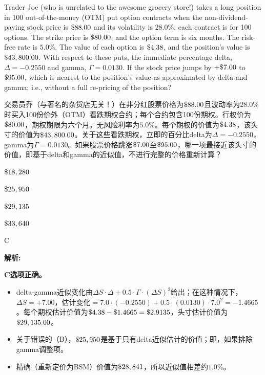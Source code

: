 \documentclass{article}
\newcommand{\dollar}{\ifmmode\text{\$}\else\$\fi}  %
\newcounter{question} %
\newenvironment{explanation}
{\textbf{解析:}\par}
{\par}
\begin{document}
\begin{question}
    Trader Joe (who is unrelated to the awesome grocery store!) takes a long position in 100 out-of-the-money (OTM) put option contracts when the non-dividend-paying stock price is $\dollar88.00$ and its volatility is $28.0\%$; each contract is for 100 options. The strike price is $\dollar80.00$, and the option term is six months. The risk-free rate is $5.0\%$. The value of each option is $\dollar4.38$, and the position's value is $\dollar43,800.00$. With respect to these puts, the immediate percentage delta, $\Delta = -0.2550$ and gamma, $\Gamma = 0.0130$. If the stock price jumps by $+\dollar7.00$ to $\dollar95.00$, which is nearest to the position's value as approximated by delta and gamma; i.e., without a full re-pricing of the position?

    交易员乔（与著名的杂货店无关！）在非分红股票价格为$\dollar88.00$且波动率为$28.0\%$时买入100份价外（OTM）看跌期权合约；每个合约包含100份期权。行权价为$\dollar80.00$，期权期限为六个月。无风险利率为$5.0\%$。每个期权的价值为$\dollar4.38$，该头寸的价值为$\dollar43,800.00$。关于这些看跌期权，立即的百分比delta为$\Delta = -0.2550$，gamma为$\Gamma = 0.0130$。如果股票价格跳涨$\dollar7.00$至$\dollar95.00$，哪一项最接近该头寸的价值，即基于delta和gamma的近似值，不进行完整的价格重新计算？
\end{question}

\begin{choices}
    \item $\dollar18,280$
    \item $\dollar25,950$
    \item $\dollar29,135$
    \item $\dollar33,640$
\end{choices}

\begin{correctanswer}
C
\end{correctanswer}

\begin{explanation}
    \textbf{C选项正确。} 
    \begin{itemize}
        \item delta-gamma近似变化由$\Delta S \cdot \Delta + 0.5 \cdot \Gamma \cdot (\Delta S)^2$给出；在这种情况下，$\Delta S = + 7.00$，估计变化$= 7.0 \cdot (-0.2550) + 0.5 \cdot (0.0130) \cdot 7.0^2 = -1.4665$。每个期权估计价值为$\dollar4.38 - \dollar1.4665 = \dollar2.9135$，头寸估计价值为$\dollar29,135.00$。
        \item 关于错误的（B），$\dollar25,950$是基于只有delta近似估计的价值；即，如果排除gamma调整项。
        \item 精确（重新定价为BSM）价值为$\dollar28,841$，所以近似值相差约$1.0\%$。
    \end{itemize}
\end{explanation}
\end{document}
